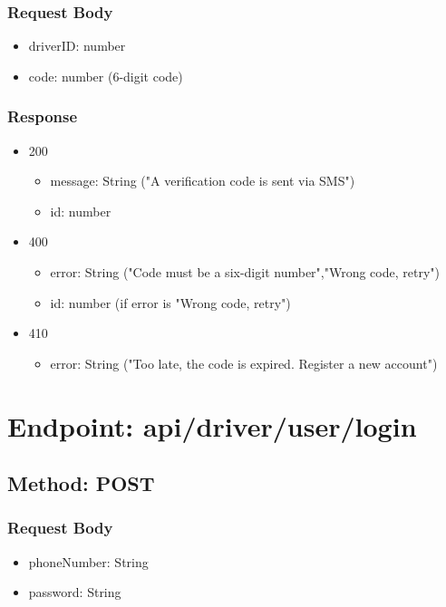 \subsubsection*{Request Body}
\begin{itemize}
    \item driverID: number
    \item code: number (6-digit code)
\end{itemize}
\subsubsection*{Response}
\begin{itemize}
    \item 200
          \begin{itemize}
              \item message: String ("A verification code is sent via SMS")
              \item id: number
          \end{itemize}
    \item 400
          \begin{itemize}
              \item error: String ("Code must be a six-digit number","Wrong code, retry")
              \item id: number (if error is "Wrong code, retry")
          \end{itemize}
    \item 410
          \begin{itemize}
              \item error: String ("Too late, the code is expired. Register a new account")
          \end{itemize}
\end{itemize}

\section*{Endpoint: api/driver/user/login}
\subsection*{Method: POST}
\subsubsection*{Request Body}
\begin{itemize}
    \item phoneNumber: String
    \item password: String
\end{itemize}
